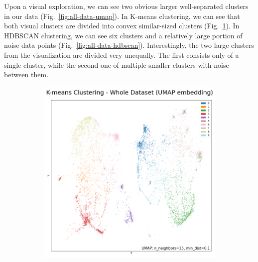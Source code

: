 Upon a visual exploration, we can see two obvious larger well-separated clusters in our data (Fig.~\ref{fig:all-data-umap}). In K-means clustering, we can see that both visual clusters are divided into convex similar-sized clusters (Fig.~\ref{fig:all_data_kmeans}). In HDBSCAN clustering, we can see six clusters and a relatively large portion of noise data points (Fig.~\ref{fig:all-data-hdbscan}). Interestingly, the two large clusters from the visualization are divided very unequally. The first consists only of a single cluster, while the second one of multiple smaller clusters with noise between them.
\begin{figure}[H]
 \centering
 \begin{subfigure}[b]{0.495\textwidth}
    \centering
    \includegraphics[width=\textwidth]{img/all-data-umap-kmeans.png}
    \caption{}
    \label{fig:all_data_kmeans}
 \end{subfigure}
 \hfill
 \begin{subfigure}[b]{0.495\textwidth}
    \centering

\end{subfigure}
\end{figure}
